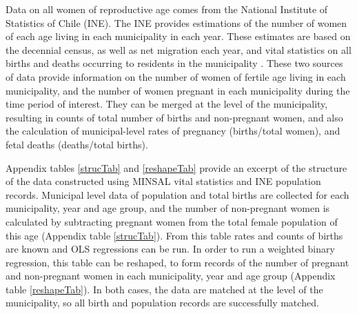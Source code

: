 \documentclass[11pt,subeqn]{article}
\begin{document}
\begin{spacing}{1.4}
Data on all women of reproductive age comes from the National Institute of 
Statistics of Chile (INE). The INE provides estimations of the number of women 
of each age living in each municipality in each year.  These estimates are based 
on the decennial census, as well as net migration each year, and vital 
statistics on all births and deaths occurring to residents in the municipality 
\citep{INE2014}.  These two sources of data provide information on the number
of women of fertile age living in each municipality, and the number of women
pregnant in each municipality during the time period of interest.  They can be
merged at the level of the municipality, resulting in counts of total number of
births and non-pregnant women, and also the calculation of municipal-level rates
of pregnancy (births/total women), and fetal deaths (deaths/total births).

Appendix tables \ref{strucTab} and \ref{reshapeTab} provide an excerpt of the
structure of the data constructed using MINSAL vital statistics and INE 
population records.  Municipal level data of population and total births are
collected for each municipality, year and age group, and the number of 
non-pregnant women is calculated by subtracting pregnant women from the total
female population of this age (Appendix table \ref{strucTab}).  From this
table rates and counts of births are known and OLS regressions can be run.  In 
order to run a weighted binary regression, this table can be reshaped, to form
records of the number of pregnant and non-pregnant women in each municipality,
year and age group (Appendix table \ref{reshapeTab}).  In both cases, the data
are matched at the level of the municipality, so all birth and population 
records are successfully matched.

\end{spacing}
\end{document}

